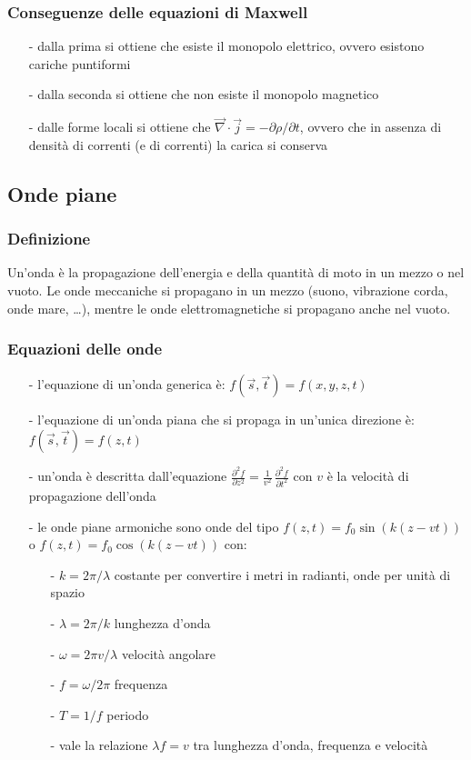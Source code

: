 \documentclass[a4paper]{article}
\newcommand\nab{\vec{\nabla}} %
\begin{document}
\subsubsection*{Conseguenze delle equazioni di Maxwell}
\begin{itemize}[topsep=3pt, itemsep=0pt]
	\item[-] dalla prima si ottiene che esiste il monopolo elettrico, ovvero esistono cariche puntiformi
	\item[-] dalla seconda si ottiene che non esiste il monopolo magnetico
	\item[-] dalle forme locali si ottiene che \(\nab \cdot \vec{j} = - \partial \rho / \partial t\), ovvero che in assenza di
	densità di correnti (e di correnti) la carica si conserva
\end{itemize}

\newpage

\subsection{Onde piane}
\subsubsection*{Definizione}
Un'onda è la propagazione dell'energia e della quantità di moto in un mezzo o nel vuoto. Le onde meccaniche si propagano in un
mezzo (suono, vibrazione corda, onde mare, \dots), mentre le onde elettromagnetiche si propagano anche nel vuoto. 

\subsubsection*{Equazioni delle onde}
\begin{itemize}[topsep=3pt, itemsep=0pt]
	\item[-] l'equazione di un'onda generica è: \(f(\vec{s}, \vec{t}) = f(x,y,z,t)\)
	\item[-] l'equazione di un'onda piana che si propaga in un'unica direzione è: \(f(\vec{s}, \vec{t}) = f(z,t)\)
	\item[-] un'onda è descritta dall'equazione \(\displaystyle \frac{\partial^2 f}{\partial z^2} = \frac{1}{v^2} \, \frac{\partial^2 f}{\partial t^2}\)
	con \(v\) è la velocità di propagazione dell'onda
	\item[-] le onde piane armoniche sono onde del tipo \(f(z,t) = f_0 \sin(k(z-vt))\) o \(f(z,t) = f_0 \cos(k(z-vt))\) con:
	\begin{itemize}[topsep=0pt, itemsep=0pt]
		\item[-] \(k = 2\pi/\lambda\) costante per convertire i metri in radianti, onde per unità di spazio
		\item[-] \(\lambda = 2 \pi / k\) lunghezza d'onda
		\item[-] \(\omega = 2 \pi v / \lambda\) velocità angolare
		\item[-] \(f = \omega / 2 \pi\) frequenza 
		\item[-] \(T = 1/f\) periodo
		\item[-] vale la relazione \(\lambda f = v\) tra lunghezza d'onda, frequenza e velocità
	\end{itemize}
\end{itemize}
\end{document}
